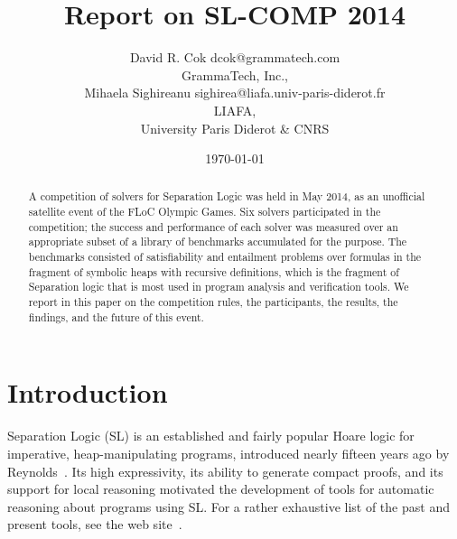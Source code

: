 \documentclass[twoside,11pt]{article}
\title{Report on SL-COMP 2014}
\author{\name David R. Cok \email dcok@grammatech.com \\
        \addr GrammaTech, Inc., \\
        \AND
        \name Mihaela Sighireanu \email sighirea@liafa.univ-paris-diderot.fr \\
         \addr LIAFA, \\
         University Paris Diderot \& CNRS}
\date{\today}
\begin{document}
\sloppy
\maketitle


\begin{abstract}
A competition of solvers for Separation Logic 
was held in May 2014, 
as an unofficial satellite event of the FLoC Olympic Games.
Six solvers participated in the competition; the success and performance
of each solver was measured over an appropriate subset of a library of benchmarks
accumulated for the purpose.
The benchmarks consisted of satisfiability and entailment problems
over formulas in the fragment of symbolic heaps with recursive definitions, 
which is the fragment of Separation logic that is most used in program analysis and verification tools.
We report in this paper on 
the competition rules, the participants, the results, the findings, and  
the future of this event.
\end{abstract}


\section{Introduction}

Separation Logic (SL) is an established and fairly popular Hoare logic 
for imperative, heap-manipulating programs, 
introduced nearly fifteen years ago by Reynolds~\cite{Reynolds99,OHearnRY01,Reynolds02}. 
%
Its high expressivity, its ability to generate compact proofs, and 
its support for local reasoning 
motivated the development of tools for automatic reasoning about programs using SL.
For a rather exhaustive list of the past and present tools, see the web site~\cite{OHearn-SLsite}.
\end{document}
